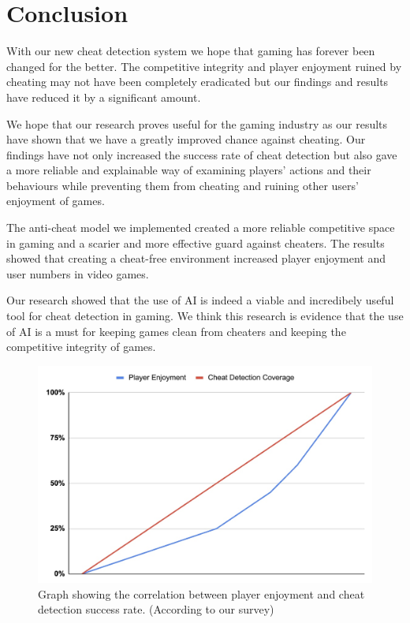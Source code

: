\section{Conclusion}
\label{ch:conclusion}

With our new cheat detection system we hope that gaming has forever been changed for the better. The competitive integrity and player enjoyment ruined by cheating may not have been completely eradicated but our findings and results have reduced it by a significant amount. 

We hope that our research proves useful for the gaming industry as our results have shown that we have a greatly improved chance against cheating. Our findings have not only increased the success rate of cheat detection but also gave a more reliable and explainable way of examining players' actions and their behaviours while preventing them from cheating and ruining other users' enjoyment of games.

The anti-cheat model we implemented created a more reliable competitive space in gaming and a scarier and more effective guard against cheaters. The results showed that creating a cheat-free environment increased player enjoyment and user numbers in video games.

Our research showed that the use of AI is indeed a viable and incredibely useful tool for cheat detection in gaming. We think this research is evidence that the use of AI is a must for keeping games clean from cheaters and keeping the competitive integrity of games.

\begin{figure}[h]
\centering
\includegraphics[width=0.8\linewidth]{images/enjoyment.jpeg}
\captionsetup{width=0.8\textwidth}
\caption{\label{fig:enjoyment}Graph showing the correlation between player enjoyment and cheat detection success rate. (According to our survey)}
\end{figure}
